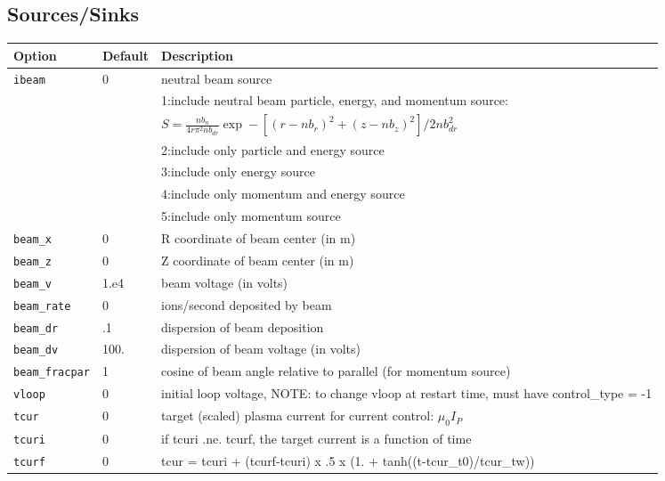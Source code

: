 \subsection{Sources/Sinks}

\begin{tabular}{llp{4.5in}}
  \textbf{Option}&\textbf{Default}&\textbf{Description}\\
  \hline
  \texttt{ibeam}    & 0 &  neutral beam source \\
                    &   &  1:include neutral beam particle, energy, and momentum source: \\
                    &   &  $S = \frac {nb_n  }{4 r \pi^2 n b_{dr}  }
                            \exp - \left[ (r - nb_r)^2 + (z - nb_z)^2 \right]/ 2 nb_{dr}^2$  \\
                    &   &  2:include only particle and energy source  \\
                    &   &  3:include only energy source  \\
                    &   &  4:include only momentum and energy source  \\
                    &   &  5:include only momentum source  \\
  \texttt{beam\_x}  & 0 & R coordinate of beam center (in m) \\
  \texttt{beam\_z}  & 0 & Z coordinate of beam center (in m) \\
  \texttt{beam\_v}  & 1.e4 & beam voltage (in volts) \\
  \texttt{beam\_rate}  & 0 & ions/second deposited by beam \\
  \texttt{beam\_dr}    & .1 & dispersion of beam deposition \\
  \texttt{beam\_dv}    & 100. & dispersion of beam voltage (in volts) \\                        
  \texttt{beam\_fracpar}  & 1 & cosine of beam angle relative to parallel (for momentum source)   \\
\hline                  
  \texttt{vloop}          & 0 & initial loop voltage,   NOTE: to change vloop at restart time, must have control\_type = -1 \\
  \texttt{tcur}           & 0 & target (scaled) plasma current for current control: $\mu_0 I_P$ \\
  \texttt{tcuri}          & 0 & if tcuri .ne. tcurf, the target current is a function of time \\
  \texttt{tcurf}          & 0 & tcur = tcuri + (tcurf-tcuri) x .5 x (1. + tanh((t-tcur\_t0)/tcur\_tw)) \\

\end{tabular}
